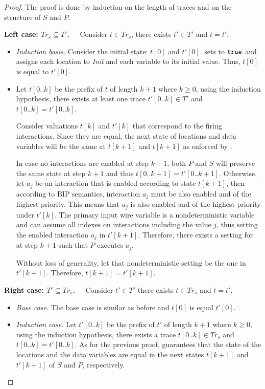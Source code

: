 \begin{proof}
\label{proof:equi-correct}
%
The proof is done by induction on the length of traces and 
on the structure of $S$ and $P$.

{\bf Left case: $Tr_s \subseteq T'$.~~}
Consider $t \in Tr_s$, there exists $t' \in T'$ and $t = t'$. 
\begin{itemize}
\item
\textit{Induction basis.}
Consider the initial state: $t[0]$ and $t'[0]$. 
 sets  to $\mathtt{true}$ and 
assigns each location to \textit{Init} and each variable 
to its initial value. Thus, $t[0]$ is equal to $t'[0]$. 
\item
Let $t[0..k]$ be the prefix of $t$ of length $k+1$ where 
$k\ge 0$, using the induction hypothesis, 
there exists at least one trace 
$t'[0..k] \in T'$ and $t[0..k]=t'[0..k]$. 

Consider valuations $t[k]$ and $t'[k]$ 
that correspond to the firing interactions.
Since they are equal, the next state of locations
and data variables will be the same at $t[k+1]$ and 
$t[k+1]$ as enforced by . 

In case no interactions are enabled at step $k+1$, 
both $P$ and $S$ will preserve the same state at step $k+1$ 
and thus $t[0..k+1] =t'[0..k+1]$. 
Otherwise, let $a_j$ be an interaction that is enabled 
according to state $t[k+1]$, 
then according to BIP semantics, interaction $a_j$ must be 
also enabled and of the highest priority. 
This means that $a_j$ is also enabled and of the highest 
priority under $t'[k]$. 
The primary input  wire variable is a 
nondeterministic variable and can assume all indexes on 
interactions including the value 
$j$, thus setting the enabled interaction $a_j$ in $t'[k+1]$. 
Therefore, there exists a setting for  at 
step $k+1$ such that $P$ executes $a_j$. 

Without loss of generality, 
let that nondeterministic setting be the one in $t'[k+1]$. 
Therefore, $t[k+1] = t'[k+1]$. 
\end{itemize}
%

{\bf Right case: $T' \subseteq Tr_s$.~~}
Consider $t' \in T'$ there exists $t \in Tr_s$ and $t = t'$.
%
\begin{itemize}
\item
\textit{Base case.}
The base case is similar as before and $t[0]$ is equal $t'[0]$.
\item
\textit{Induction case.}
Let $t'[0..k]$ be the prefix of $t'$ of length $k+1$ 
where $k\ge 0$, using the induction hypothesis, 
there exists a trace 
$t[0..k] \in Tr_s$ and $t[0..k]=t'[0..k]$. 
As for the previous proof,  
guarantees that the state of the locations and the data 
variables are equal in the next states $t[k+1]$ and 
$t'[k+1]$ of $S$ and $P$, respectively. 


\end{itemize}
\end{proof}
